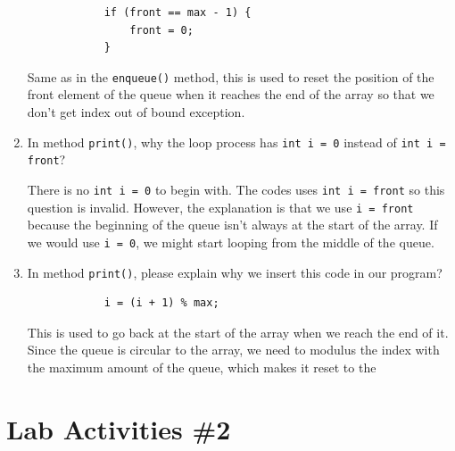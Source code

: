 \documentclass[12pt,titlepage]{article}
\begin{document}
\begin{enumerate}
{        \begin{verbatim}
            if (front == max - 1) {
                front = 0;
            }
        \end{verbatim}

        Same as in the \texttt{enqueue()} method, this is used to reset the position of the front element of the queue
        when it reaches the end of the array so that we don't get index out of bound exception.
    }
    \item {
        In method \texttt{print()}, why the loop process has \texttt{int i = 0} instead of \texttt{int i = front}?

        There is no \texttt{int i = 0} to begin with. The codes uses \texttt{int i = front} so this question is invalid.
        However, the explanation is that we use \texttt{i = front} because the beginning of the queue isn't always at the start of the array.
        If we would use \texttt{i = 0}, we might start looping from the middle of the queue.
    }
    \item {
        In method \texttt{print()}, please explain why we insert this code in our program?
        
        \begin{verbatim}
            i = (i + 1) % max;
        \end{verbatim}

        This is used to go back at the start of the array when we reach the end of it. Since the queue is circular to the array,
        we need to modulus the index with the maximum amount of the queue, which makes it reset to the 
    }
\end{enumerate}

\section*{Lab Activities \#2}
\end{document}
